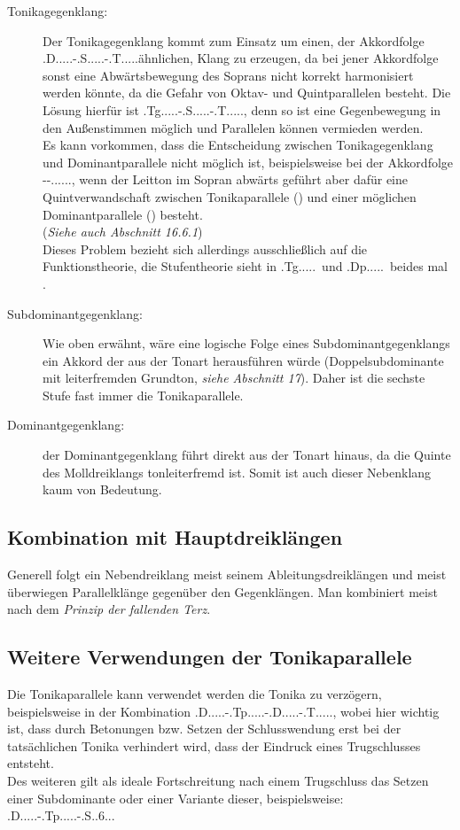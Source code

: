 \documentclass[a4paper]{article}
\newcommand{\dS}[1]{\HH.\uppercase\expandafter{\romannumeral #1\relax}.....} %
\newcommand{\mS}[1]{\textbf{\romannumeral #1}} %
\newcommand{\T}{\HH.T.....}
\newcommand{\Tp}{\HH.Tp.....}
\newcommand{\Tg}{\HH.Tg.....}
\renewcommand{\S}{\HH.S.....}
\newcommand{\Shoch}[2]{\HH.S.#2.#1...}
\newcommand{\D}{\HH.D.....}
\newcommand{\Dp}{\HH.Dp.....}
\begin{document}
	\begin{description}
		\item[Tonikagegenklang:] Der Tonikagegenklang kommt zum Einsatz um einen, der Akkordfolge \D-\S-\T ähnlichen, Klang zu erzeugen, da bei jener Akkordfolge sonst eine Abwärtsbewegung des Soprans nicht korrekt harmonisiert werden könnte, da die Gefahr von Oktav- und Quintparallelen besteht. Die Lösung hierfür ist \Tg-\S-\T, denn so ist eine Gegenbewegung in den Außenstimmen möglich und Parallelen können vermieden werden.\\
		Es kann vorkommen, dass die Entscheidung zwischen Tonikagegenklang und Dominantparallele nicht möglich ist, beispielsweise bei der Akkordfolge \mS{6}-\mS{3}-\dS{4}, wenn der Leitton im Sopran abwärts geführt aber dafür eine Quintverwandschaft zwischen Tonikaparallele (\mS{6}) und einer möglichen Dominantparallele (\mS{3}) besteht.\\
		(\textit{Siehe auch Abschnitt 16.6.1})\\
		Dieses Problem bezieht sich allerdings ausschließlich auf die Funktionstheorie, die Stufentheorie sieht in \Tg\ und \Dp\ beides mal \mS{3}.
		
		\item[Subdominantgegenklang:] Wie oben erwähnt, wäre eine logische Folge eines Subdominantgegenklangs ein Akkord der aus der Tonart herausführen würde (Doppelsubdominante mit leiterfremden Grundton, \textit{siehe Abschnitt 17}). Daher ist die sechste Stufe fast immer die Tonikaparallele.
		
		\item[Dominantgegenklang:] der Dominantgegenklang führt direkt aus der Tonart hinaus, da die Quinte des Molldreiklangs tonleiterfremd ist. Somit ist auch dieser Nebenklang kaum von Bedeutung.
	\end{description}

	\subsection{Kombination mit Hauptdreiklängen}
	Generell folgt ein Nebendreiklang meist seinem Ableitungsdreiklängen und meist überwiegen Parallelklänge gegenüber den Gegenklängen. Man kombiniert meist nach dem \textit{Prinzip der fallenden Terz}.
	
	\subsection{Weitere Verwendungen der Tonikaparallele}
	Die Tonikaparallele kann verwendet werden die Tonika zu verzögern, beispielsweise in der Kombination \D-\Tp-\D-\T, wobei hier wichtig ist, dass durch Betonungen bzw. Setzen der Schlusswendung erst bei der tatsächlichen Tonika verhindert wird, dass der Eindruck eines Trugschlusses entsteht.\\
	Des weiteren gilt als ideale Fortschreitung nach einem Trugschluss das Setzen einer Subdominante oder einer Variante dieser, beispielsweise: \D-\Tp-\Shoch{6}{}
	
\end{document}
